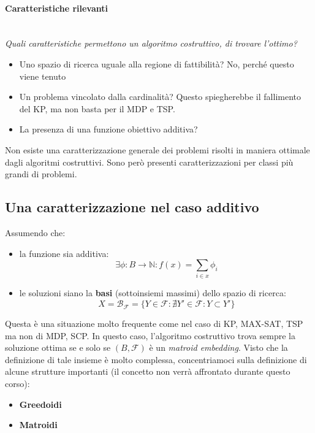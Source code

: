 \documentclass{article}
\begin{document}
    \paragraph{Caratteristiche rilevanti}\mbox{}\\
    \textit{Quali caratteristiche permettono un algoritmo costruttivo, di trovare l'ottimo?}
    \begin{itemize}
        \item Uno spazio di ricerca uguale alla regione di fattibilità? No, perché questo viene tenuto
        \item Un problema vincolato dalla cardinalità? Questo spiegherebbe il fallimento del KP,
              ma non basta per il MDP e TSP.
        \item La presenza di una funzione obiettivo additiva?
    \end{itemize}
    Non esiste una caratterizzazione generale dei problemi risolti in maniera ottimale dagli algoritmi
    costruttivi. Sono però presenti caratterizzazioni per classi più grandi di problemi.

    \subsection{Una caratterizzazione nel caso additivo}
    Assumendo che:
    \begin{itemize}
        \item la funzione sia additiva:
              $$\exists\phi : B\rightarrow\mathbb{N}:f(x)=\sum_{i\in x}\phi_i$$
        \item le soluzioni siano la \textbf{basi} (sottoinsiemi massimi) dello spazio di ricerca:
              $$X=\mathcal{B}_\mathcal{F}=\{Y\in\mathcal{F}:\nexists Y'\in\mathcal{F}:Y\subset Y'\}$$
    \end{itemize}
    Questa è una situazione molto frequente come nel caso di KP, MAX-SAT, TSP ma non di MDP, SCP.
    In questo caso, l'algoritmo costruttivo trova sempre la soluzione ottima se e solo se $(B,\mathcal{F})$
    è un \textit{matroid embedding}. Visto che la definizione di tale insieme è molto complessa,
    concentriamoci sulla definizione di alcune strutture importanti (il concetto non verrà
    affrontato durante questo corso):
    \begin{itemize}
        \item \textbf{Greedoidi}
        \item \textbf{Matroidi}
    \end{itemize}
\end{document}

